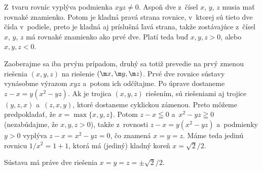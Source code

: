 {%
Z~tvaru rovníc vyplýva podmienka $xyz\ne0$. Aspoň dve z~čísel $x$, $y$,
$z$ musia mať rovnaké znamienko. Potom je kladná pravá strana rovnice,
v~ktorej sú tieto dve čísla v~podiele, preto je kladná aj príslušná
ľavá strana, takže zostávajúce z~čísel $x$, $y$, $z$ má rovnaké znamienko
ako prvé dve. Platí teda buď $x,y,z>0$, alebo $x,y,z<0$.

Zaoberajme sa iba prvým prípadom, druhý sa totiž prevedie na
prvý zmenou riešenia $(x,y,z)$ na riešenie $(\m x,\m y,\m z)$. Prvé
dve rovnice sústavy vynásobme výrazom $xyz$ a~potom ich odčítajme.
Po úprave dostaneme $z-x=y(x^2-yz)$. Ak je trojica $(x,y,z)$
riešením, sú riešeniami aj trojice $(y,z,x)$ a~$(z,x,y)$, ktoré
dostaneme cyklickou zámenou. Preto môžeme predpokladať, že
$x=\max\{x,y,z\}$. Potom $z-x\leqq0$ a~$x^2-yz\geqq0$
(nezabúdajme, že $x,y,z>0$), takže z~rovnosti $z-x=y(x^2-yz)$
a~podmienky $y>0$ vyplýva $z-x=x^2-yz=0$, čo znamená $x=y=z$. Máme
teda jedinú rovnicu $1/x^2=1+1$, ktorá má (jediný) kladný koreň
$x=\sqrt2/2$.

\odpoved
Sústava má práve dve riešenia $x=y=z=\pm\sqrt2/2$.}

